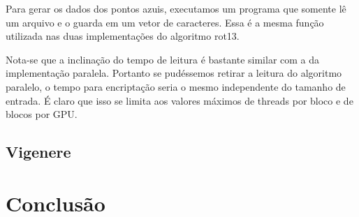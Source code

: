 \documentclass[12pt]{article}
\begin{document}
Para gerar os dados dos pontos azuis, executamos um programa que somente
lê um arquivo e o guarda em um vetor de caracteres. Essa é a mesma
função utilizada nas duas implementações do algoritmo rot13. 

Nota-se que a inclinação do tempo de leitura é bastante similar com a da
implementação paralela. Portanto se pudéssemos retirar a leitura do 
algoritmo paralelo, o tempo para encriptação seria o mesmo independente
do tamanho de entrada. É claro que isso se limita aos valores máximos
de threads por bloco e de blocos por GPU. 

\subsection{Vigenere}


\newpage
\section{Conclusão}
\end{document}
